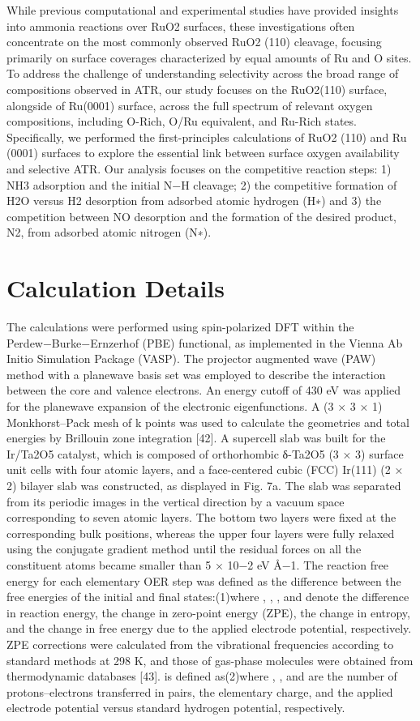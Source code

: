 \documentclass[twocolumn,showpacs,%
  nofootinbib,aps,superscriptaddress,%
  eqsecnum,prd,notitlepage,showkeys,10pt]{revtex4-1}
\begin{document}
While previous computational and experimental studies have provided insights into ammonia reactions over RuO2 surfaces, these investigations often concentrate on the most commonly observed RuO2 (110) cleavage, focusing primarily on surface coverages characterized by equal amounts of Ru and O sites. To address the challenge of understanding selectivity across the broad range of compositions observed in ATR, our study focuses on the RuO2(110) surface, alongside of Ru(0001) surface, across the full spectrum of relevant oxygen compositions, including O-Rich, O/Ru equivalent, and Ru-Rich states.
Specifically, we performed the first-principles calculations of RuO2 (110) and Ru (0001) surfaces to explore the essential link between surface oxygen availability and selective ATR. Our analysis focuses on the competitive reaction steps: 1) NH3 adsorption and the initial N−H cleavage; 2) the competitive formation of H2O versus H2 desorption from adsorbed atomic hydrogen (H∗) and 3) the competition between NO desorption and the formation of the desired product, N2, from adsorbed atomic nitrogen (N∗).

\section{Calculation Details}
The calculations were performed using spin-polarized DFT within the Perdew−Burke−Ernzerhof (PBE) functional, as implemented in the Vienna Ab Initio Simulation Package (VASP). The projector augmented wave (PAW) method with a planewave basis set was employed to describe the interaction between the core and valence electrons. An energy cutoff of 430 eV was applied for the planewave expansion of the electronic eigenfunctions. A (3 × 3 × 1) Monkhorst–Pack mesh of k points was used to calculate the geometries and total energies by Brillouin zone integration [42]. A supercell slab was built for the Ir/Ta2O5 catalyst, which is composed of orthorhombic δ-Ta2O5 (3 × 3) surface unit cells with four atomic layers, and a face-centered cubic (FCC) Ir(111) (2 × 2) bilayer slab was constructed, as displayed in Fig. 7a. The slab was separated from its periodic images in the vertical direction by a vacuum space corresponding to seven atomic layers. The bottom two layers were fixed at the corresponding bulk positions, whereas the upper four layers were fully relaxed using the conjugate gradient method until the residual forces on all the constituent atoms became smaller than 5 × 10−2 eV Å−1. The reaction free energy  for each elementary OER step was defined as the difference between the free energies of the initial and final states:(1)where , , , and  denote the difference in reaction energy, the change in zero-point energy (ZPE), the change in entropy, and the change in free energy due to the applied electrode potential, respectively. ZPE corrections were calculated from the vibrational frequencies according to standard methods at 298 K, and those of gas-phase molecules were obtained from thermodynamic databases [43].  is defined as(2)where , , and  are the number of protons–electrons transferred in pairs, the elementary charge, and the applied electrode potential versus standard hydrogen potential, respectively.
\label{sec:examples}
\end{document}

